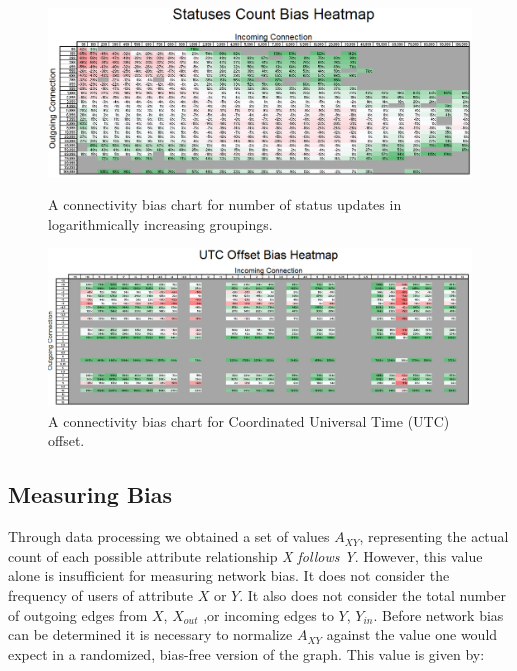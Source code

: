 \begin{figure}[t]
 \centering
 \includegraphics[bb=0 0 802 319,scale=.53]{./images/statuses_count.png}
 \label{fig:status_count}
 \caption{A connectivity bias chart for number of status updates in logarithmically increasing groupings.}
\end{figure}

\begin{figure}[t]
 \centering
 \includegraphics[bb=0 0 840 315,scale=.5]{./images/utc_offset.png}
 \caption{A connectivity bias chart for Coordinated Universal Time (UTC) offset.}
 \label{fig:utc_offset}
\end{figure}

\subsection{Measuring Bias}

Through data processing we obtained a set of values $A_{XY}$, representing the actual count of each possible attribute relationship \textit{X follows Y}.  However, this value alone is insufficient for measuring network bias.  It does not consider the frequency of users of attribute $X$ or $Y$.  It also does not consider the total number of outgoing edges from $X$, $X_{out}$ ,or incoming edges to $Y$, $Y_{in}$.  Before network bias can be determined it is necessary to normalize $A_{XY}$ against the value one would expect in a randomized, bias-free version of the graph.  This value is given by:

